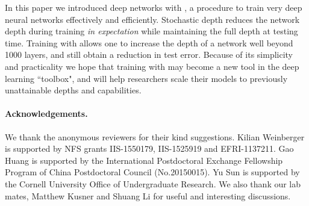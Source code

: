 In this paper we introduced deep networks with \emph{\name{}}, a procedure to train very deep neural networks effectively and efficiently. Stochastic depth reduces the network depth during training \emph{in expectation} while maintaining the full depth at testing time. Training with \name{} allows one to increase the depth of a network well beyond 1000 layers, and still obtain a reduction in test error. Because of its simplicity and practicality we hope that training with \name{} may become a new tool in the deep learning ``toolbox", and will help researchers scale their models to previously unattainable depths and capabilities.

\paragraph{\textbf{Acknowledgements.}} We thank the anonymous reviewers for their kind suggestions. Kilian Weinberger is supported by NFS grants IIS-1550179, IIS-1525919 and EFRI-1137211. Gao Huang is supported by the International Postdoctoral Exchange Fellowship Program of China Postdoctoral Council (No.20150015). Yu Sun is supported by the Cornell University Office of Undergraduate Research. We also thank our lab mates, Matthew Kusner and Shuang Li for useful and interesting discussions.